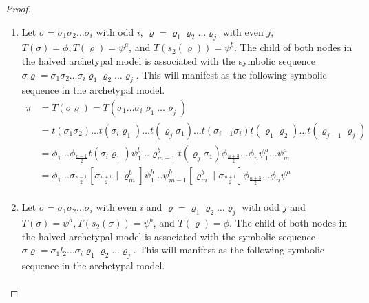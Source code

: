 \begin{proof} \phantom{x}
	\begin{enumerate}
		\item Let $\sigma = \sigma_1\sigma_2 \dots \sigma_i$ with odd $i$, $\varrho = \varrho_1\varrho_2 \dots \varrho_j$ with even $j$, $T(\sigma) = \phi, T(\varrho) = \psi^a$, and $T(s_2(\varrho)) = \psi^b$.
		      The child of both nodes in the halved archetypal model is associated with the symbolic sequence $\sigma\varrho = \sigma_1\sigma_2 \dots \sigma_i \varrho_1\varrho_2 \dots \varrho_j$.
		      This will manifest as the following symbolic sequence in the archetypal model.
		      \begin{align*}
			      \pi & = T(\sigma\varrho)  = T(\sigma_1 \dots \sigma_i \varrho_1 \dots \varrho_j)                                                                                \\
			          & =
			      t(\sigma_1\sigma_2) \dots t(\sigma_i \varrho_1) \dots t(\varrho_j \sigma_1) \dots t(\sigma_{i-1}\sigma_i) t(\varrho_1\varrho_2) \dots t(\varrho_{j-1}\varrho_j) \\
			          & = \phi_1 \dots \phi_{\frac{n-1}{2}} t(\sigma_i \varrho_1)
			      \psi^b_1 \dots \varrho^b_{m-1} t(\varrho_j \sigma_1)
			      \phi_{\frac{n+3}{2}} \dots \phi_n
			      \psi^a_1 \dots \psi^a_m                                                                                                                                         \\
			          & =
			      \phi_1 \dots \sigma_{\frac{n-1}{2}} \left[\sigma_{\frac{n+1}{2}} \mid \varrho^b_m\right]
			      \psi^b_1 \dots \psi^b_{m-1} \left[\varrho^b_m \mid \sigma_{\frac{n+1}{2}}\right]
			      \phi_{\frac{n+3}{2}} \dots \phi_n
			      \psi^a                                                                                                                                                          \\
		      \end{align*}
		\item Let $\sigma = \sigma_1\sigma_2 \dots \sigma_i$ with even $i$ and $\varrho = \varrho_1\varrho_2 \dots \varrho_j$ with odd $j$ and $T(\sigma) = \psi^a, T(s_2(\sigma)) = \psi^b$, and $T(\varrho) = \phi$.
		      The child of both nodes in the halved archetypal model is associated with the symbolic sequence $\sigma\varrho = \sigma_1l_2 \dots \sigma_i \varrho_1\varrho_2 \dots \varrho_j$.
		      This will manifest as the following symbolic sequence in the archetypal model.
		      \begin{align*}

\end{align*}
\end{enumerate}
\end{proof}

